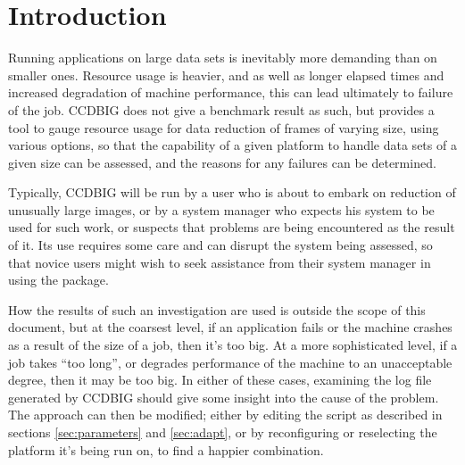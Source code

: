 \stardocabstract
 \begin{latexonly}
   \setlength{\parskip}{0mm}
   \latexonlytoc
   \setlength{\parskip}{\medskipamount}
   \markright{\stardocname}
 \end{latexonly}
\newpage
\renewcommand{\thepage}{\arabic{page}}
\setcounter{page}{1}




\newcommand{\KAPPAref}{\xref{KAPPA}{sun95}{}}
\newcommand{\CCDPref}{\xref{CCDPACK}{sun139}{}}
\newcommand{\GWMref}{\xref{GWM}{sun130}{}}
\newcommand{\KAPPAcmd}[1]{\xref{#1}{sun95}{#1}}
\newcommand{\CCDPcmd}[1]{\xref{#1}{sun139}{#1}}




\section{Introduction}

Running applications on large data sets 
is inevitably more demanding than on smaller ones.
Resource usage is heavier, and as well as longer 
elapsed times and increased degradation of machine performance, 
this can lead ultimately to failure of the job. 
CCDBIG does not give a benchmark result as such,
but provides a tool to gauge resource usage 
for data reduction of frames of varying size,
using various options,
so that the capability of a given platform to handle data sets
of a given size can be assessed, 
and the reasons for any failures can be determined.

Typically, CCDBIG will be run by a user who is about to
embark on reduction of unusually large images, or by a 
system manager who expects his system to be used for such work, 
or suspects that problems are being encountered as the result of it.
Its use requires some care and can disrupt the system being 
assessed, so that novice users might wish to seek assistance
from their system manager in using the package.

How the results of such an investigation are used is
outside the scope of this document,
but at the coarsest level, if an application fails 
or the machine crashes
as a result of the size of a job,
then it's too big. 
At a more sophisticated level, if a job takes ``too long'',
or degrades performance of the machine to an unacceptable degree,
then it may be too big.
In either of these cases, examining the log file
generated by CCDBIG should give some
insight into the cause of the problem.
The approach
can then be modified;
either by editing the script as described in sections
\ref{sec:parameters} and \ref{sec:adapt},
or by reconfiguring or reselecting the platform it's being run on,
to find a happier combination.

